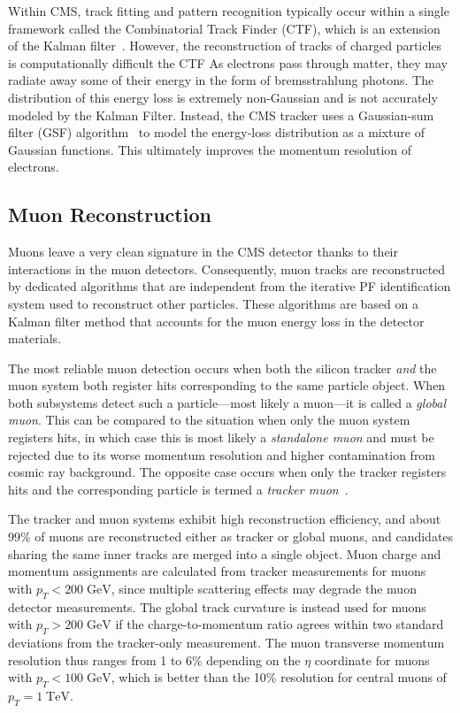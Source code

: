 Within CMS, track fitting and pattern recognition typically occur within a single framework called the Combinatorial Track Finder (CTF), which is an extension of the Kalman filter~\cite{general_track_reco}.
However, the reconstruction of tracks of charged particles is computationally difficult  the CTF 
As electrons pass through matter, they may radiate away some of their energy in the form of bremsstrahlung photons.
The distribution of this energy loss is extremely non-Gaussian and is not accurately modeled by the Kalman Filter.
Instead, the CMS tracker uses a Gaussian-sum filter (GSF) algorithm~\cite{gsf} to model the energy-loss distribution as a mixture of Gaussian functions.
This ultimately improves the momentum resolution of electrons.

\subsection{Muon Reconstruction}
\label{sec:muon_reco}
Muons leave a very clean signature in the CMS detector thanks to their interactions in the muon detectors.
Consequently, muon tracks are reconstructed by dedicated algorithms that are independent from the iterative PF identification system used to reconstruct other particles.
These algorithms are based on a Kalman filter method that accounts for the muon energy loss in the detector materials.

The most reliable muon detection occurs when both the silicon tracker \emph{and} the muon system both register hits corresponding to the same particle object.
When both subsystems detect such a particle---most likely a muon---it is called a \emph{global muon}.
This can be compared to the situation when only the muon system registers hits, in which case this is most likely a \emph{standalone muon} and must be rejected due to its worse momentum resolution and higher contamination from cosmic ray background.
The opposite case occurs when only the tracker registers hits and the corresponding particle is termed a \emph{tracker muon}~\cite{reco_muon}.

The tracker and muon systems exhibit high reconstruction efficiency, and about 99\% of muons are reconstructed either as tracker or global muons, and candidates sharing the same inner tracks are merged into a single object. Muon charge and momentum assignments are calculated from tracker measurements for muons with $p_T < 200 \;\text{GeV}$, since multiple scattering effects may degrade the muon detector measurements. The global track curvature is instead used for muons with $p_T > 200 \;\text{GeV}$ if the charge-to-momentum ratio agrees within two standard deviations from the tracker-only measurement. The muon transverse momentum resolution thus ranges from 1 to 6\% depending on the $\eta$ coordinate for muons with $p_T < 100 \;\text{GeV}$, which is better than the 10\% resolution for central muons of $p_T = 1 \;\text{TeV}$.

